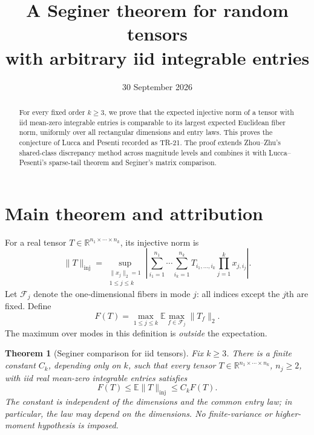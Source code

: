 \documentclass[11pt]{article}
\title{A Seginer theorem for random tensors\\with arbitrary iid integrable entries}
\author{}
\date{30 September 2026}
\theoremstyle{spaced}
\newtheorem{theorem}{Theorem}[section]
\theoremstyle{remark}
\numberwithin{equation}{section}
\newcommand{\E}{\mathbb E}
\newcommand{\inj}{\mathrm{inj}}
\begin{document}
\maketitle

\begin{abstract}
For every fixed order $k\ge3$, we prove that the expected injective norm
of a tensor with iid mean-zero integrable entries is comparable to its
largest expected Euclidean fiber norm, uniformly over all rectangular
dimensions and entry laws. This proves the conjecture of Lucca and
Pesenti recorded as TR-21. The proof extends Zhou--Zhu's shared-class
discrepancy method across magnitude levels and combines it with
Lucca--Pesenti's sparse-tail theorem and Seginer's matrix comparison.
\end{abstract}

\section{Main theorem and attribution}\label{sec:main}

For a real tensor $T\in\mathbb R^{n_1\times\cdots\times n_k}$, its
injective norm is
\begin{equation}\label{eq:injective-definition}
 \|T\|_{\inj}
 =\sup_{\substack{\|x_j\|_2=1\\1\le j\le k}}
 \left|\sum_{i_1=1}^{n_1}\cdots\sum_{i_k=1}^{n_k}
 T_{i_1,\ldots,i_k}\prod_{j=1}^k x_{j,i_j}\right|.
\end{equation}
Let $\mathcal F_j$ denote the one-dimensional fibers in mode $j$:
all indices except the $j$th are fixed. Define
\begin{equation}\label{eq:fiber-definition}
 F(T)=\max_{1\le j\le k}\E\max_{f\in\mathcal F_j}\|T_f\|_2.
\end{equation}
The maximum over modes in this definition is \emph{outside} the
expectation.

\begin{theorem}[Seginer comparison for iid tensors]\label{thm:main}
Fix $k\ge3$. There is a finite constant $C_k$, depending only on $k$,
such that every tensor $T\in\mathbb R^{n_1\times\cdots\times n_k}$,
$n_j\ge2$, with iid real mean-zero integrable entries satisfies
\begin{equation}\label{eq:main-comparison}
 F(T)\le\E\|T\|_{\inj}\le C_kF(T).
\end{equation}
The constant is independent of the dimensions and the common entry law;
in particular, the law may depend on the dimensions. No finite-variance
or higher-moment hypothesis is imposed.
\end{theorem}
\end{document}
